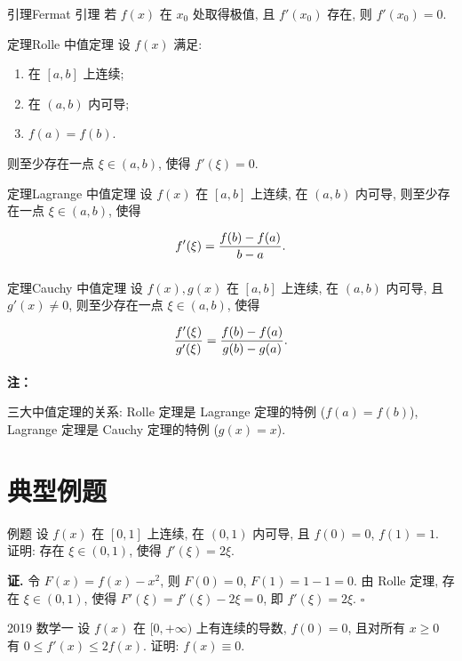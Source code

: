 \documentclass[a4paper,12pt,oneside,fontset=none]{ctexbook}
\renewcommand{\ge}{\geqslant}
\renewcommand{\le}{\leqslant}
\let\olddfrac\dfrac
\renewcommand{\dfrac}[2]{
    \olddfrac{#1\vrule width 0pt height 1.15em depth 0em}{#2\vrule width 0pt height 0em depth 0.6em}
}
\newcounter{theorem}[chapter]
\newenvironment{theorem}[1][]{\begin{thmBox}{定理}{#1}}{\end{thmBox}}
\newenvironment{lemma}[1][]{\begin{thmBox}{引理}{#1}}{\end{thmBox}}
\newcounter{example}[chapter]
\newenvironment{example}[1][]{\begin{exBox}{例题}{#1}}{\end{exBox}}
\newenvironment{realexam}[1][]
{%
\begin{realexamBox}{#1}}{\end{realexamBox}
}
\newenvironment{note}{
    \par\vspace{0.5em}\noindent
    \textbf{\color{NoteColor} 注：}
}{
    \par\vspace{0.5em}
}
\numberwithin{equation}{chapter}
\begin{document}
\begin{lemma}[Fermat 引理]
若 $f(x)$ 在 $x_0$ 处取得极值, 且 $f'(x_0)$ 存在, 则 $f'(x_0) = 0$.
\end{lemma}

\begin{theorem}[Rolle 中值定理]
设 $f(x)$ 满足:
\begin{enumerate}
    \item 在 $[a, b]$ 上连续;
    \item 在 $(a, b)$ 内可导;
    \item $f(a) = f(b)$.
\end{enumerate}
则至少存在一点 $\xi \in (a, b)$, 使得 $f'(\xi) = 0$.
\end{theorem}

\begin{theorem}[Lagrange 中值定理]
设 $f(x)$ 在 $[a, b]$ 上连续, 在 $(a, b)$ 内可导, 则至少存在一点 $\xi \in (a, b)$, 使得
\[
    f'(\xi) = \dfrac{f(b) - f(a)}{b - a}.
\]
\end{theorem}

\begin{theorem}[Cauchy 中值定理]
设 $f(x), g(x)$ 在 $[a, b]$ 上连续, 在 $(a, b)$ 内可导, 且 $g'(x) \neq 0$, 则至少存在一点 $\xi \in (a, b)$, 使得
\[
    \dfrac{f'(\xi)}{g'(\xi)} = \dfrac{f(b) - f(a)}{g(b) - g(a)}.
\]
\end{theorem}

\begin{note}
三大中值定理的关系: Rolle 定理是 Lagrange 定理的特例 ($f(a) = f(b)$), Lagrange 定理是 Cauchy 定理的特例 ($g(x) = x$).
\end{note}

\section{典型例题}

\begin{example}
设 $f(x)$ 在 $[0, 1]$ 上连续, 在 $(0, 1)$ 内可导, 且 $f(0) = 0$, $f(1) = 1$. 证明: 存在 $\xi \in (0, 1)$, 使得 $f'(\xi) = 2\xi$.
\end{example}

\textbf{证.} 令 $F(x) = f(x) - x^2$, 则 $F(0) = 0$, $F(1) = 1 - 1 = 0$. 由 Rolle 定理, 存在 $\xi \in (0, 1)$, 使得 $F'(\xi) = f'(\xi) - 2\xi = 0$, 即 $f'(\xi) = 2\xi$. \hfill $\square$

\begin{realexam}[2019 数学一]
设 $f(x)$ 在 $[0, +\infty)$ 上有连续的导数, $f(0) = 0$, 且对所有 $x \ge 0$ 有 $0 \le f'(x) \le 2f(x)$. 证明: $f(x) \equiv 0$.
\end{realexam}
\end{document}
